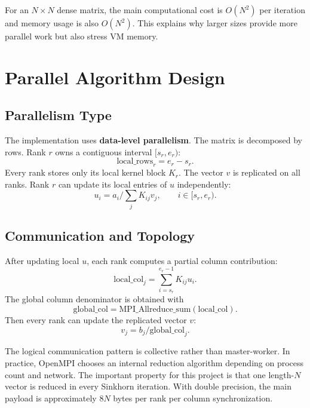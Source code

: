 \documentclass[12pt,a4paper]{article}
\begin{document}
For an $N \times N$ dense matrix, the main computational cost is $O(N^2)$ per iteration and memory usage is also $O(N^2)$. This explains why larger sizes provide more parallel work but also stress VM memory.

\section{Parallel Algorithm Design}

\subsection{Parallelism Type}

The implementation uses \textbf{data-level parallelism}. The matrix is decomposed by rows. Rank $r$ owns a contiguous interval $[s_r,e_r)$:
\[
\mathrm{local\_rows}_r = e_r - s_r.
\]
Every rank stores only its local kernel block $K_r$. The vector $v$ is replicated on all ranks. Rank $r$ can update its local entries of $u$ independently:
\[
u_i = a_i / \sum_j K_{ij}v_j, \qquad i \in [s_r,e_r).
\]

\subsection{Communication and Topology}

After updating local $u$, each rank computes a partial column contribution:
\[
\mathrm{local\_col}_j = \sum_{i=s_r}^{e_r-1} K_{ij}u_i.
\]
The global column denominator is obtained with
\[
\mathrm{global\_col} = \mathrm{MPI\_Allreduce\_sum}(\mathrm{local\_col}).
\]
Then every rank can update the replicated vector $v$:
\[
v_j = b_j / \mathrm{global\_col}_j.
\]

The logical communication pattern is collective rather than master-worker. In practice, OpenMPI chooses an internal reduction algorithm depending on process count and network. The important property for this project is that one length-$N$ vector is reduced in every Sinkhorn iteration. With double precision, the main payload is approximately $8N$ bytes per rank per column synchronization.
\end{document}
